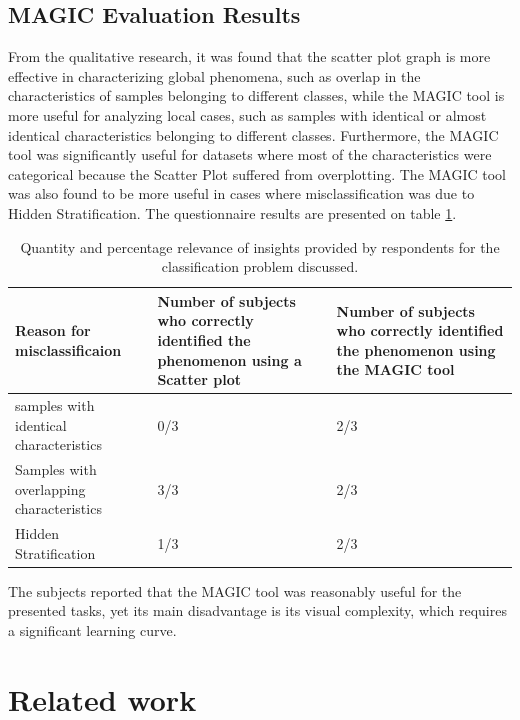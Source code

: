 \documentclass[11pt]{article}
\begin{document}
\subsection{MAGIC Evaluation Results}\label{MAGIC Evaluation Results}
From the qualitative research, it was found that the scatter plot graph is more effective in characterizing global phenomena, such as overlap in the characteristics of samples belonging to different classes, while the MAGIC tool is more useful for analyzing local cases, such as samples with identical or almost identical characteristics belonging to different classes. Furthermore, the MAGIC tool was significantly useful for datasets where most of the characteristics were categorical because the Scatter Plot suffered from overplotting. The MAGIC tool was also found to be more useful in cases where misclassification was due to Hidden Stratification. The questionnaire results are presented on table \ref{table:tab2}.\\



\begin{table}[H]
\centering
\begin{tabular}{ |m{4cm}||m{4.5cm}|m{4.5cm}| } 
\hline
Reason for misclassificaion & Number of subjects who correctly identified the phenomenon using a Scatter plot & Number of subjects who correctly identified the phenomenon using the MAGIC tool \\
\hline
\hline
samples with identical characteristics & 0/3 & 2/3 \\
\hline
Samples with overlapping characteristics & 3/3 & 2/3 \\
\hline
Hidden Stratification & 1/3 & 2/3 \\
\hline
\end{tabular}
\caption{Quantity and percentage relevance of insights provided by respondents for the classification problem discussed.}
\label{table:tab2}
\end{table}

The subjects reported that the MAGIC tool was reasonably useful for the presented tasks, yet its main disadvantage is its visual complexity, which requires a significant learning curve.

\section{Related work}\label{Related work}
\end{document}
